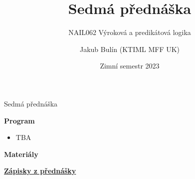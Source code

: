 \documentclass{beamer}
\title{Sedmá přednáška}
\subtitle{NAIL062 Výroková a predikátová logika}
\author{Jakub Bulín (KTIML MFF UK)}
\date{Zimní semestr 2023}
\begin{document}
\frame{\titlepage}


\begin{frame}{Sedmá přednáška}

    \textbf{Program}
        \begin{itemize}
            \item TBA
        \end{itemize}        
    

    \textbf{Materiály}

        \href{https://github.com/jbulin-mff-uk/nail062/raw/main/lecture/lecture-notes/lecture-notes.pdf}{\alert{\textbf{Zápisky z přednášky}}}%

\end{frame}
\end{document}
